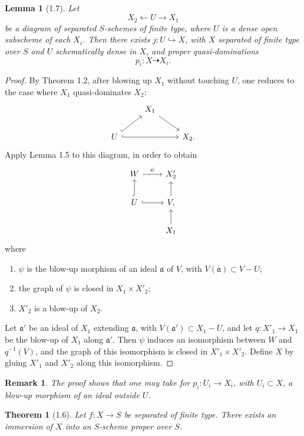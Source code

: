 \documentclass[11pt]{article}
\newtheorem*{theorem}{Theorem}
\newtheorem*{lemma}{Lemma}
\newtheorem*{remark}{Remark}
\begin{document}
\begin{lemma}[1.7]
Let
\[
X_2 \xleftarrow{\ } U \xrightarrow{\ } X_1
\]
be a diagram of separated \(S\)-schemes of finite type, where \(U\) is a dense open subscheme of each \(X_i\). Then there exists \(j:U\hookrightarrow X\), with \(X\) separated of finite type over \(S\) and \(U\) schematically dense in \(X\), and proper quasi-dominations
\[
p_i:X\dashrightarrow X_i.
\]
\end{lemma}

\begin{proof}
By Theorem 1.2, after blowing up \(X_1\) without touching \(U\), one reduces to the case where \(X_1\) quasi-dominates \(X_2\):
\[
\begin{tikzcd}
& X_1 \ar[dr] & \\
U \ar[ur,hook] \ar[rr,hook] && X_2.
\end{tikzcd}
\]
Apply Lemma 1.5 to this diagram, in order to obtain
\[
\begin{tikzcd}
W \ar[r,"\psi"] & X'_2 \\
U \ar[u,hook] \ar[r,hook] & V \ar[u], \\
& X_1 \ar[u]
\end{tikzcd}
\]
where
\begin{enumerate}[label=(\alph*)]
\item \(\psi\) is the blow-up morphism of an ideal \(\mathfrak a\) of \(V\), with \(V(\mathfrak a)\subset V-U\);
\item the graph of \(\psi\) is closed in \(X_1\times X'_2\);
\item \(X'_2\) is a blow-up of \(X_2\).
\end{enumerate}
Let \(\mathfrak a'\) be an ideal of \(X_1\) extending \(\mathfrak a\), with \(V(\mathfrak a')\subset X_1-U\), and let \(q:X'_1\to X_1\) be the blow-up of \(X_1\) along \(\mathfrak a'\). Then \(\psi\) induces an isomorphism between \(W\) and \(q^{-1}(V)\), and the graph of this isomorphism is closed in \(X'_1\times X'_2\). Define \(X\) by gluing \(X'_1\) and \(X'_2\) along this isomorphism.
\end{proof}

\begin{remark}
The proof shows that one may take for \(p_i:U_i\to X_i\), with \(U_i\subset X\), a blow-up morphism of an ideal outside \(U\).
\end{remark}

\begin{theorem}[1.6]
Let \(f:X\to S\) be separated of finite type. There exists an immersion of \(X\) into an \(S\)-scheme proper over \(S\).
\end{theorem}
\end{document}
